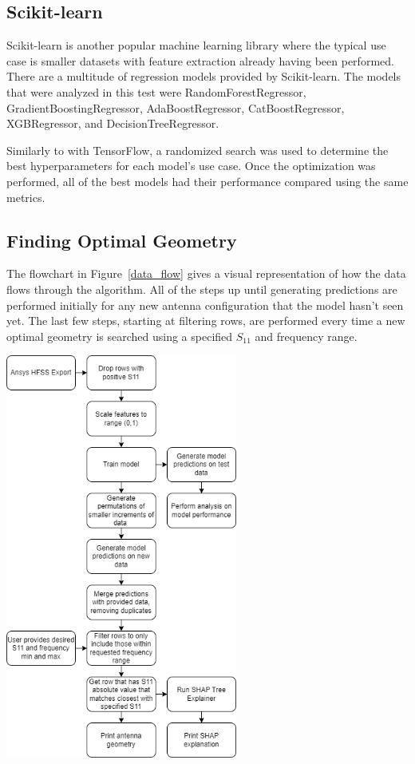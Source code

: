 \documentclass[lettersize,journal]{IEEEtran}
\newenvironment{Figure}
    {\par\medskip\noindent\minipage{\linewidth}}
    {\endminipage\par\medskip}
\begin{document}
\subsection{Scikit-learn}
Scikit-learn is another popular machine learning library where the typical use case is smaller datasets with feature extraction already having been performed. There are a multitude of regression models provided by Scikit-learn. The models that were analyzed in this test were RandomForestRegressor, GradientBoostingRegressor, AdaBoostRegressor, CatBoostRegressor, XGBRegressor, and DecisionTreeRegressor.

Similarly to with TensorFlow, a randomized search was used to determine the best hyperparameters for each model's use case. Once the optimization was performed, all of the best models had their performance compared using the same metrics. 

\subsection{Finding Optimal Geometry}
The flowchart in Figure~\ref{data_flow} gives a visual representation of how the data flows through the algorithm. All of the steps up until generating predictions are performed initially for any new antenna configuration that the model hasn't seen yet. The last few steps, starting at filtering rows, are performed every time a new optimal geometry is searched using a specified $S_{11}$ and frequency range. 

\begin{Figure}
\centering
\includegraphics[width=3.0in]{methodology}
\label{data_flow}
\end{Figure}
\end{document}
